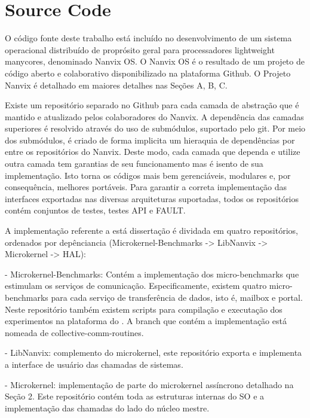 \chapter{Source Code}
\label{ch:source-code}

\label{sec:code-structure}

O código fonte deste trabalho está incluído no desenvolvimento de um sistema
operacional distribuído de proprósito geral para processadores lightweight manycores,
denominado Nanvix OS. O Nanvix OS é o resultado de um projeto de código aberto
e colaborativo disponibilizado na plataforma Github. O Projeto Nanvix é detalhado em
maiores detalhes nas Seções A, B, C.

Existe um repositório separado no Github para cada camada de abstração que é mantido
e atualizado pelos colaboradores do Nanvix. A dependência das camadas superiores é
resolvido através do uso de submódulos, suportado pelo git. Por meio dos submódulos,
é criado de forma implicita um hieraquia de dependências por entre os repositórios do Nanvix.
Deste modo, cada camada que dependa e utilize outra camada tem garantias de seu funcionamento
mas é isento de sua implementação. Isto torna os códigos mais bem gerenciáveis, modulares e,
por consequência, melhores portáveis. Para garantir a correta implementação das interfaces
exportadas nas diversas arquiteturas suportadas, todos os repositórios contém conjuntos de
testes, \ie testes API e FAULT.

A implementação referente a está dissertação é dividada em quatro repositórios, ordenados por
depênciancia (Microkernel-Benchmarks -> LibNanvix -> Microkernel -> HAL):

- Microkernel-Benchmarks: Contém a implementação dos micro-benchmarks que estimulam os serviços
de comunicação. Especificamente, existem quatro micro-benchmarks para cada serviço de transferência de dados,
isto é, mailbox e portal. Neste repositório também existem scripts para compilação e executação dos
experimentos na plataforma do \mppa. A branch que contém a implementação está nomeada de collective-comm-routines.

- LibNanvix: complemento do microkernel, este repositório exporta e implementa a interface
de usuário das chamadas de sistemas.

- Microkernel: implementação de parte do microkernel assíncrono detalhado na Seção 2.
Este repositório contém toda as estruturas internas do SO e a implementação das chamadas
do lado do núcleo mestre.

